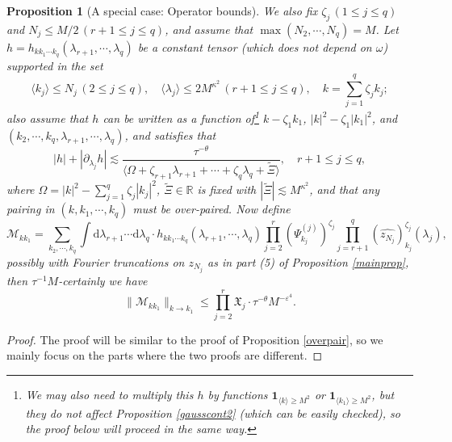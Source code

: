 \documentclass[11 pt,reqno]{amsart}
\newtheorem{prop}[thm]{Proposition}
\theoremstyle{definition}
\theoremstyle{remark}
\numberwithin{equation}{section}
\newcommand{\Rb}{\mathbb{R}}
\newcommand{\Xf}{\mathfrak{X}}
\newcommand{\Ms}{\mathscr{M}}
\begin{document}
{\begin{prop}[A special case: Operator bounds]
We also fix $\zeta_j\,(1\leq j\leq q)$ and $N_j\leq M/2\,(r+1\leq j\leq q)$, and assume that $\max(N_2,\cdots,N_q)=M$. Let $h=h_{kk_1\cdots k_q}(\lambda_{r+1},\cdots,\lambda_q)$ be a constant tensor (which does not depend on $\omega$) supported in the set \begin{equation}\label{operatorbdnew1}
\langle k_j\rangle\leq N_j\,(2\leq j\leq q),\quad\langle\lambda_j\rangle\leq 2M^{\kappa^2}\,(r+1\leq j\leq q),\quad k=\sum_{j=1}^q\zeta_jk_j;
\end{equation} also assume that $h$ \emph{can be written as a function of\footnote{We may also need to multiply this $h$ by functions $\mathbf{1}_{\langle k\rangle\geq M^2}$ or $\mathbf{1}_{\langle k_1\rangle\geq M^2}$, but they do not affect Proposition \ref{gausscont2} (which can be easily checked), so the proof below will proceed in the same way.} $k-\zeta_1k_1$, $|k|^2-\zeta_1|k_1|^2$, and $(k_2,\cdots,k_q,\lambda_{r+1},\cdots,\lambda_q)$}, and satisfies that
\begin{equation}\label{operatorbdnew2}|h|+|\partial_{\lambda_j}h|\lesssim \frac{\tau^{-\theta}}{\langle\Omega+
\zeta_{r+1}\lambda_{r+1}+\cdots+\zeta_q\lambda_q+\widetilde{\Xi}\rangle},\quad r+1\leq j\leq q,
\end{equation}where $\Omega=|k|^2-\sum_{j=1}^q\zeta_j|k_j|^2$, $\widetilde{\Xi}\in\Rb$ is fixed with $|\widetilde{\Xi}|\lesssim M^{\kappa^2}$, and that any pairing in $(k,k_1,\cdots,k_q)$ must be over-paired.
Now define 
\begin{equation}\label{operatorbdnew3}\Ms_{kk_1}=\sum_{k_2,\cdots,k_q}\int\mathrm{d}\lambda_{r+1}\cdots\mathrm{d}\lambda_q\cdot h_{kk_1\cdots k_q}(\lambda_{r+1},\cdots,\lambda_q)\prod_{j=2}^r(\Psi_{k_j}^{(j)})^{\zeta_j}\prod_{j=r+1}^q(\widehat{z_{N_j}})_{k_j}^{\zeta_j}(\lambda_j),
\end{equation} possibly with Fourier truncations on $z_{N_j}$ as in part (5) of Proposition \ref{mainprop}, then $\tau^{-1}M$-certainly we have
\begin{equation}\label{operatorbdnew4}\|\Ms_{kk_1}\|_{k\to k_1}\leq\prod_{j=2}^r\Xf_j\cdot\tau^{-\theta}M^{-\varepsilon^4}.
\end{equation}
\end{prop}
\begin{proof} The proof will be similar to the proof of Proposition \ref{overpair}, so we mainly focus on the parts where the two proofs are different.


\end{proof}}
\end{document}
